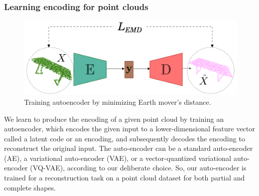         \subsubsection{Learning encoding for point clouds}
        \begin{figure}[htb]
          \begin{center}
          \includegraphics[width=\linewidth]{figures/emd_ae.png}
          \end{center}
          \caption{Training autoencoder by minimizing Earth mover's distance.}\label{fig:emd_ae}
        \end{figure}
        We learn to produce the encoding of a given point cloud by training an autoencoder, which encodes the given input to a lower-dimensional feature vector called a latent code or an encoding, and subsequently decodes the encoding to reconstruct the original input. The auto-encoder can be a standard auto-encoder (AE), a variational auto-encoder (VAE), or a vector-quantized variational auto-encoder (VQ-VAE), according to our deliberate choice. So, our auto-encoder is trained for a reconstruction task on a point cloud dataset for both partial and complete shapes.
        \newline
        
